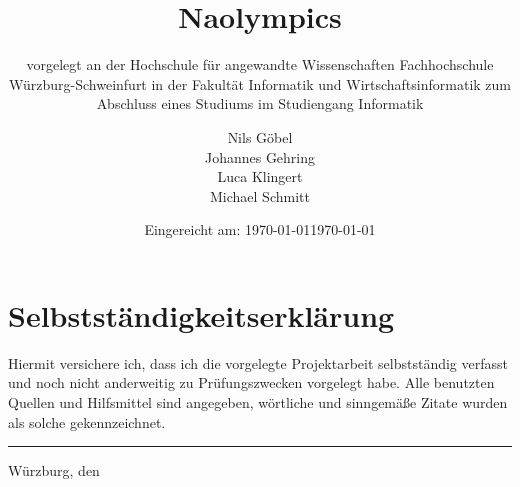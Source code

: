 \documentclass[12pt,a4paper,DIV13,pdftex,BCOR10mm,fleqn,liststotoc,bibtotoc,cleardoubleempty]{scrbook}
\begin{document}
\frontmatter
\titlehead{%
  {Hochschule f\"{u}r angewandte Wissenschaften\\
   Fachhochschule W\"{u}rzburg-Schweinfurt\\
   Fakult\"{a}t Informatik und Wirtschaftsinformatik}}
\subject{Projektarbeit}
\title{Naolympics\\[10mm]}
\subtitle{\normalsize{vorgelegt an der Hochschule f\"{u}r angewandte Wissenschaften Fachhochschule W\"{u}rzburg-Schweinfurt in der Fakult\"{a}t Informatik und Wirtschaftsinformatik zum Abschluss eines Studiums im Studiengang Informatik}}
\author{Nils G\"obel\\Johannes Gehring\\Luca Klingert\\Michael Schmitt}
\date{\normalsize{Eingereicht am: \today}}
\publishers{
  \normalsize{Erstpr\"{u}fer: Prof. Dr. Arndt Balzer} \\
  \normalsize{Zweitpr\"{u}fer: Prof. Dr. Daniel Kulesz}\\
}


\maketitle

\thispagestyle{empty}
\section*{Selbstständigkeitserklärung}
Hiermit versichere ich, dass ich die vorgelegte Projektarbeit selbstständig verfasst und noch nicht anderweitig zu Pr\"{u}fungszwecken vorgelegt habe. Alle benutzten Quellen und Hilfsmittel sind angegeben, w\"{o}rtliche und sinngem\"{a}{\ss}e Zitate wurden als solche gekennzeichnet.\\[15mm]
\vspace{20mm}
\hrule
\vspace{5mm}
W\"urzburg, den \date{\today}

\cleardoublepage     %

\nonfrenchspacing
\renewcommand{\figurename}{Abb.}
\renewcommand{\tablename}{Tab.}

\tableofcontents %
\listoffigures %
\listoftables
\end{document}
